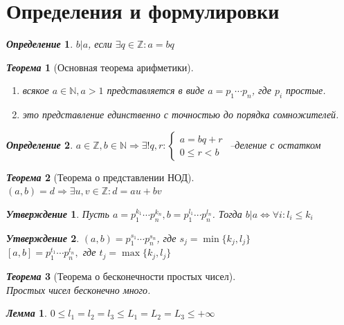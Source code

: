\documentclass[a4paper,12pt]{article}
\newtheorem{deff2}{\textit{Определение}}
\newtheorem{teo2}{\textit{Теорема}}
\newtheorem{utv2}{\textit{Утверждение}}
\newtheorem{lem2}{\textit{Лемма}}
\newcommand{\q}{\quad}
\newcommand{\Ra}{\Rightarrow}
\newcommand{\bb}[1]{\mathbb{#1}}
\begin{document}
\newpage

\section{Определения и формулировки}
\begin{deff2} $b|a$, если $\exists q\in \mathbb{Z}: a=bq$
\end{deff2}
\begin{teo2}[Основная теорема арифметики]\q\\
\begin{enumerate}
    \item всякое $a \in \bb{N}, a > 1$ представляется в виде $a = p_1\cdots p_n$, где $p_i$ простые.
    \item это представление единственно с точностью до порядка сомножителей.
\end{enumerate}
\end{teo2}

\begin{deff2} $a\in \bb{Z}, b\in\bb{N}\Rightarrow \exists ! q,r: \begin{cases} a = bq+r\\0 \le r < b\end{cases} $ --деление с остатком
\end{deff2}

\begin{teo2}[Теорема о представлении НОД]\q\\
$(a,b) = d \Ra \exists u,v\in\bb{Z}: d = au+bv$
\end{teo2}
\begin{utv2} Пусть $a = p_1^{k_1}\cdots p_n^{k_n}, b = p_1^{l_1}\cdots p_n^{l_n}$. Тогда $b|a\iff \forall i: l_i \le k_i$
\end{utv2}

\begin{utv2} $(a,b) = p_1^{s_1}\cdots p_n^{s_n}$, где $s_j = \min\{k_j, l_j\}$\\
$[a,b] = p_1^{t_1}\cdots p_n^{t_n},$ где $t_j = \max\{k_j, l_j\}$
\end{utv2}
\begin{teo2}[Теорема о бесконечности простых чисел]\q\\
Простых чисел бесконечно много.
\end{teo2}

\begin{lem2}
$0\le l_1 = l_2 = l_3 \le L_1 = L_2 = L_3 \le +\infty$
\end{lem2}
\end{document}
